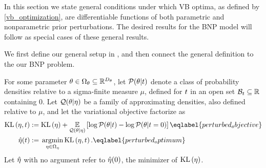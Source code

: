 In this section we state general conditions under which VB optima, as defined by
\eqref{vb_optimization}, are differentiable functions of both parametric and
nonparametric prior perturbations.  The desired results for the BNP model will
follow as special cases of these general results.

We first define our general setup in , and then connect
the general definition to the our BNP problem.

\begin{defn}
%
For some parameter $\theta \in \Omega_{\theta} \subseteq \mathbb{R}^{{D_{\theta}}}$, let
$\mathcal{P}(\theta \vert t)$ denote a class of probability densities relative to
a sigma-finite measure $\mu$, defined for $t$ in an open set $\mathcal{B}_t
\subseteq \mathbb{R}$ containing $0$.  Let $\mathcal{Q}(\theta \vert \eta)$ be a
family of approximating densities, also defined relative to $\mu$, and let
the variational objective factorize as
%
\begin{align}
%
\KL{\eta, \t} :={}& \KL{\eta} +
    \expect{\q(\theta \vert \eta)}
           {\log \p(\theta \vert \t) - \log \p(\theta \vert \t=0)}
           \eqlabel{perturbed_objective}\\
\etaopt(\t) :={}& \argmin_{\eta \in \etadom} \KL{\eta, \t}.
    \eqlabel{perturbed_optimum}
%
\end{align}
%
Let $\hat\eta$ with no argument refer to $\hat\eta(0)$, the minimizer
of $\mathrm{KL}\left(\eta\right)$.
%
\end{defn}

